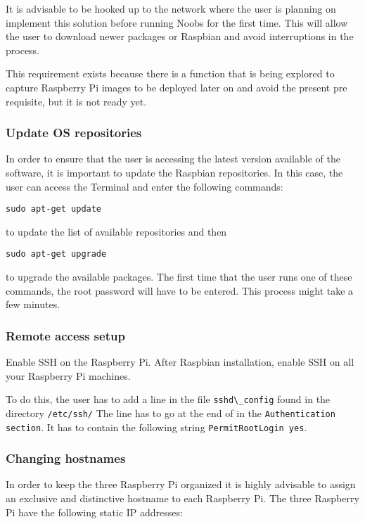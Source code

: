 It is advisable to be hooked up to the network where the user is
planning on implement this solution before running Noobs for the first
time. This will allow the user to download newer packages or Raspbian
and avoid interruptions in the process.
		
This requirement exists because there is a function that is being
explored to capture Raspberry Pi images to be deployed later on and
avoid the present pre requisite, but it is not ready yet.
	
\subsubsection{Update OS repositories}

In order to ensure that the user is accessing the latest version
available of the software, it is important to update the Raspbian
repositories.  In this case, the user can access the Terminal and
enter the following commands:
	
\verb|sudo apt-get update| 

to update the list of
available repositories and then 

\verb|sudo apt-get upgrade| 

to upgrade the available packages. The first time that the user runs
one of these commands, the root password will have to be entered.
This process might take a few minutes. \cite{debianpackage}
	
\subsubsection{Remote access setup}

Enable SSH on the Raspberry Pi.  After Raspbian installation, enable
SSH on all your Raspberry Pi machines.
	
To do this, the user has to add a line in the file
\verb|sshd\_config| found in the directory
\verb|/etc/ssh/| The line has to go at the end of in
the \verb|Authentication section|.  It has to contain
the following string \verb|PermitRootLogin yes|.
\cite{rootSsh}
	
\subsubsection{Changing hostnames}

In order to keep the three Raspberry Pi organized it is highly
advisable to assign an exclusive and distinctive hostname to each
Raspberry Pi.  The three Raspberry Pi have the following static IP
addresses:

